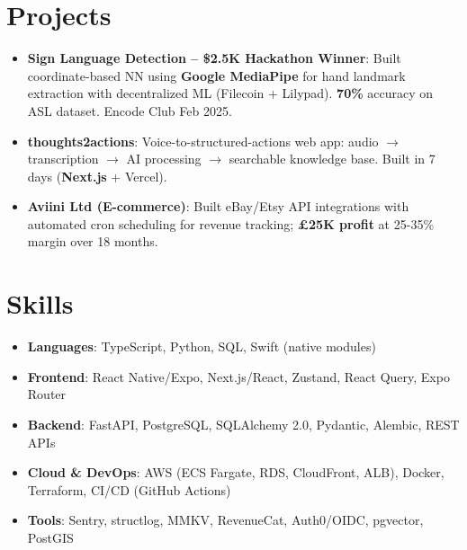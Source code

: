 \documentclass[letterpaper,11pt]{article}
\newcommand{\resumeItem}[2]{
  \item\small{
    \textbf{#1}{: #2 \vspace{-2pt}}
  }
}
\newcommand{\resumeSubItem}[2]{\resumeItem{#1}{#2}\vspace{-4pt}}
\newcommand{\resumeSubHeadingListStart}{\begin{itemize}[leftmargin=*]}
\newcommand{\resumeSubHeadingListEnd}{\end{itemize}}
\begin{document}
\section{Projects}
  \resumeSubHeadingListStart
    \resumeSubItem{Sign Language Detection -- \$2.5K Hackathon Winner}
      {Built coordinate-based NN using \textbf{Google MediaPipe} for hand landmark extraction with decentralized ML (Filecoin + Lilypad). \textbf{70\%} accuracy on ASL dataset. Encode Club Feb 2025.}
    \resumeSubItem{thoughts2actions}
      {Voice-to-structured-actions web app: audio $\rightarrow$ transcription $\rightarrow$ AI processing $\rightarrow$ searchable knowledge base. Built in 7 days (\textbf{Next.js} + Vercel).}
    \resumeSubItem{Aviini Ltd (E-commerce)}
      {Built eBay/Etsy API integrations with automated cron scheduling for revenue tracking; \textbf{\pounds25K profit} at 25-35\% margin over 18 months.}
  \resumeSubHeadingListEnd

\section{Skills}
 \resumeSubHeadingListStart
   \resumeSubItem{Languages}{TypeScript, Python, SQL, Swift (native modules)}
   \resumeSubItem{Frontend}{React Native/Expo, Next.js/React, Zustand, React Query, Expo Router}
   \resumeSubItem{Backend}{FastAPI, PostgreSQL, SQLAlchemy 2.0, Pydantic, Alembic, REST APIs}
   \resumeSubItem{Cloud \& DevOps}{AWS (ECS Fargate, RDS, CloudFront, ALB), Docker, Terraform, CI/CD (GitHub Actions)}
   \resumeSubItem{Tools}{Sentry, structlog, MMKV, RevenueCat, Auth0/OIDC, pgvector, PostGIS}
 \resumeSubHeadingListEnd
\end{document}
